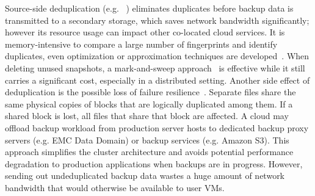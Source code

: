 Source-side deduplication (e.g. ~\cite{Symantec2009})
 eliminates duplicates before backup data is transmitted
to a secondary storage, which saves network bandwidth significantly; however its resource
usage can impact other co-located cloud services. 
It is memory-intensive to compare a large number of fingerprints and identify
duplicates, even optimization or approximation techniques are developed~\cite{Guo2011,Dong2011,extreme_binning09}. 
When deleting unused snapshots, a mark-and-sweep approach~\cite{Guo2011,Fabiano2013}  
is effective while it still carries a significant cost, especially in a distributed
setting.  Another side effect of deduplication is the possible loss of failure
resilience~\cite{Reliability06}.  Separate files share the same physical copies of blocks that are
logically duplicated among them.  If a shared block is lost, all files that
share that block are affected.  
A cloud may offload backup workload from production 
server hosts to dedicated backup proxy servers (e.g. EMC Data Domain) or
backup services (e.g. Amazon S3). This approach simplifies the cluster 
architecture and 
avoids potential performance degradation to production applications when 
backups are in progress.
However, sending out undeduplicated backup data wastes a huge amount
of network bandwidth that would otherwise be available to user VMs. 


